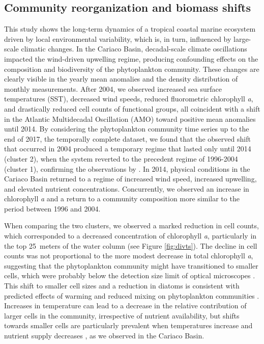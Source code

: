 \documentclass[draft]{agujournal2019}
\begin{document}
\subsection{Community reorganization and biomass shifts}
    This study shows the long-term dynamics of a tropical coastal marine ecosystem driven by local environmental variability, which is, in turn, influenced by large-scale climatic changes. In the Cariaco Basin, decadal-scale climate oscillations impacted the wind-driven upwelling regime, producing confounding effects on the composition and biodiversity of the phytoplankton community.
    These changes are clearly visible in the yearly mean anomalies and the density distribution of monthly measurements. After 2004, we observed increased sea surface temperatures (SST), decreased wind speeds, reduced fluorometric chlorophyll \textit{a}, and drastically reduced cell counts of functional groups, all coincident with a shift in the Atlantic Multidecadal Oscillation (AMO) toward positive mean anomalies until 2014. 
    By considering the phytoplankton community time series up to the end of 2017, the temporally complete dataset, we found that the observed shift that occurred in 2004 produced a temporary regime that lasted only until 2014 (cluster 2), when the system reverted to the precedent regime of 1996-2004 (cluster 1), confirming the observations by . In 2014, physical conditions in the Cariaco Basin returned to a regime of increased wind speed, increased upwelling, and elevated nutrient concentrations. Concurrently, we observed an increase in chlorophyll \textit{a} and a return to a community composition more similar to the period between 1996 and 2004.
    
    When comparing the two clusters, we observed a marked reduction in cell counts, which corresponded to a decreased concentration of chlorophyll \textit{a}, particularly in the top \qty{25}{meters} of the water column (see Figure \ref{fig:divts}). The decline in cell counts was not proportional to the more modest decrease in total chlorophyll \textit{a}, suggesting that the phytoplankton community might have transitioned to smaller cells, which were probably below the detection size limit of optical microscopes \cite{muller-karger_scientific_2019}. This shift to smaller cell sizes and a reduction in diatoms is consistent with predicted effects of warming and reduced mixing on phytoplankton communities \cite{bopp_response_2005}. Increases in temperature can lead to a decrease in the relative contribution of larger cells in the community, irrespective of nutrient availability, but shifts towards smaller cells are particularly prevalent when temperatures increase and nutrient supply decreases \cite{acevedo-trejos_glimpse_2014, mousing_global_2014}, as we observed in the Cariaco Basin. 
    
\end{document}
